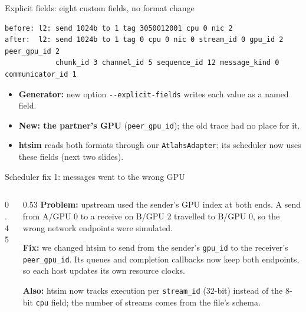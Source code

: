\documentclass[aspectratio=169,11pt]{beamer}
\begin{document}
\begin{frame}[fragile]{Explicit fields: eight custom fields, no format change}
\begin{lstlisting}
before: l2: send 1024b to 1 tag 3050012001 cpu 0 nic 2
after:  l2: send 1024b to 1 tag 0 cpu 0 nic 0 stream_id 0 gpu_id 2 peer_gpu_id 2
            chunk_id 3 channel_id 5 sequence_id 12 message_kind 0 communicator_id 1
\end{lstlisting}
\vspace{2mm}
\begin{itemize}
\item \textbf{Generator:} new option \texttt{-{}-explicit-fields} writes each value as a named field.
\item \textbf{New: the partner's GPU} (\texttt{peer\_gpu\_id}); the old trace had no place for it.
\item \textbf{htsim} reads both formats through our \texttt{AtlahsAdapter}; its scheduler now uses these fields (next two slides).
\end{itemize}
\end{frame}

\begin{frame}{Scheduler fix 1: messages went to the wrong GPU}
\begin{columns}[c]
\begin{column}{0.45\textwidth}
\centering

\end{column}
\begin{column}{0.53\textwidth}
\small
\textbf{Problem:} upstream used the sender's GPU index at both ends. A send from A/GPU 0 to a receive on B/GPU 2 travelled to B/GPU 0, so the wrong network endpoints were simulated.
\vspace{2mm}

\textbf{Fix:} we changed htsim to send from the sender's \texttt{gpu\_id} to the receiver's \texttt{peer\_gpu\_id}. Its queues and completion callbacks now keep both endpoints, so each host updates its own resource clocks.
\vspace{2mm}

\textbf{Also:} htsim now tracks execution per \texttt{stream\_id} (32-bit) instead of the 8-bit \texttt{cpu} field; the number of streams comes from the file's schema.
\end{column}
\end{columns}
\end{frame}
\end{document}
